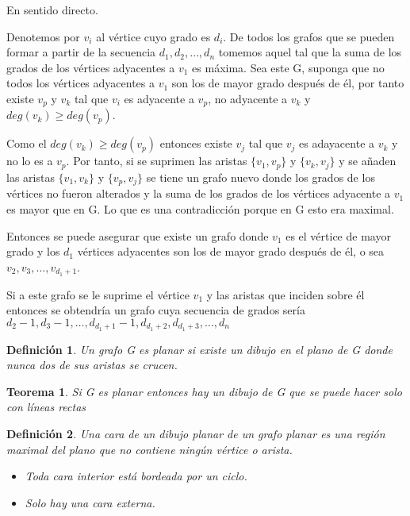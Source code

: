 \documentclass[a4paper,1pt]{report}
\newtheorem*{teo}{Teorema}
\newtheorem*{dfn}{Definición}
\begin{document}
En sentido directo.

Denotemos por $v_i$ al vértice cuyo grado es $d_i$. De todos los grafos que se pueden formar a partir de la secuencia $d_1,d_2,\dots,d_n$ tomemos aquel tal que la suma de los grados de los vértices adyacentes a $v_1$ es máxima. Sea este G, suponga que no todos los vértices adyacentes a $v_1$ son los de mayor grado después de él, por tanto existe $v_p$ y $v_k$ tal que $v_i$ es adyacente a $v_p$, no adyacente a $v_k$ y $deg(v_k)\geq deg(v_p)$.

Como el $deg(v_k)\geq deg(v_p)$ entonces existe $v_j$ tal que $v_j$ es adayacente a $v_k$ y no lo es a $v_p$.  Por tanto, si se suprimen las aristas $\{v_1,v_p\}$ y $\{v_k,v_j\}$ y se añaden las aristas $\{v_1,v_k\}$ y $\{v_p,v_j\}$ se tiene un grafo nuevo donde los grados de los vértices no fueron alterados y la suma de los grados de los vértices adyacente a $v_1$ es mayor que en G. Lo que es una contradicción porque en G esto era maximal.

Entonces se puede asegurar que existe un grafo donde $v_1$ es el vértice de mayor grado y los $d_1$ vértices adyacentes son los de mayor grado después de él, o sea $v_2,v_3,\dots,v_{d_1+1}$.

Si a este grafo se le suprime el vértice $v_1$ y las aristas que inciden sobre él entonces se obtendría un grafo cuya secuencia de grados sería \\
$d_2-1,d_3-1,\dots,d_{d_1+1}-1,d_{d_1+2},d_{d_1+3},\dots,d_n$

\begin{dfn}
 Un grafo G es planar si existe un dibujo en el plano de G donde nunca dos de sus aristas se crucen.
\end{dfn}

\begin{teo}
 Si G es planar entonces hay un dibujo de G que se puede hacer solo con líneas rectas
\end{teo}



\begin{dfn}
Una cara de un dibujo planar de un grafo planar es una región maximal del plano que no contiene ningún vértice o arista. 

\begin{itemize}
 \item Toda cara interior está bordeada por un ciclo.
 \item Solo hay una cara externa.
\end{itemize}

\end{dfn}
\end{document}
